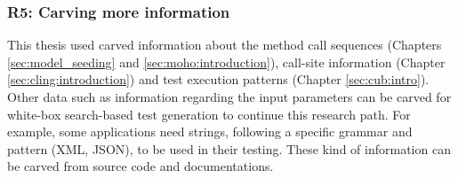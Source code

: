 \subsubsection{R5: Carving more information}
This thesis used carved information about the method call sequences (\eg Chapters \ref{sec:model_seeding} and \ref{sec:moho:introduction}), call-site information (Chapter \ref{sec:cling:introduction}) and test execution patterns (Chapter \ref{sec:cub:intro}). Other data such as information regarding the input parameters can be carved for white-box search-based test generation to continue this research path. For example, some applications need strings, following a specific grammar and pattern (\eg XML, JSON), to be used in their testing. These kind of information can be carved from source code and documentations.